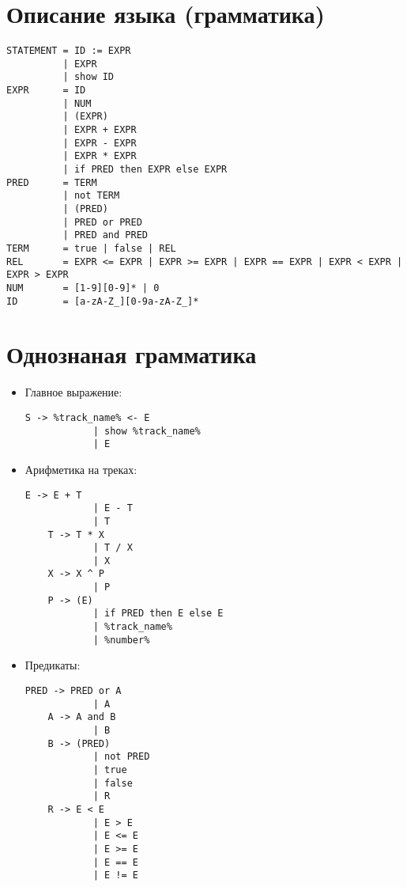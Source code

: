 \newpage
\section*{Описание языка (грамматика)}
\begin{lstlisting}
STATEMENT = ID := EXPR 
          | EXPR
          | show ID
EXPR      = ID
          | NUM
          | (EXPR)
          | EXPR + EXPR
          | EXPR - EXPR
          | EXPR * EXPR
          | if PRED then EXPR else EXPR
PRED      = TERM
          | not TERM
          | (PRED)
          | PRED or PRED
          | PRED and PRED
TERM      = true | false | REL
REL       = EXPR <= EXPR | EXPR >= EXPR | EXPR == EXPR | EXPR < EXPR | EXPR > EXPR
NUM       = [1-9][0-9]* | 0
ID        = [a-zA-Z_][0-9a-zA-Z_]*
\end{lstlisting}

\newpage
\section*{Однознаная грамматика}

\begin{itemize}
\item Главное выражение:
\begin{lstlisting}[style=nonumbers]
	S -> %track_name% <- E
			| show %track_name%
			| E
\end{lstlisting}

\item Арифметика на треках:
\begin{lstlisting}[style=nonumbers]
	E -> E + T
			| E - T
			| T
	T -> T * X
			| T / X
			| X
	X -> X ^ P
			| P
	P -> (E) 
			| if PRED then E else E
			| %track_name% 
			| %number%
\end{lstlisting}

\item Предикаты:
\begin{lstlisting}[style=nonumbers]
	PRED -> PRED or A
			| A
	A -> A and B
			| B
	B -> (PRED)
			| not PRED
			| true
			| false
			| R
	R -> E < E
			| E > E
			| E <= E
			| E >= E
			| E == E
			| E != E
\end{lstlisting}

\end{itemize}

\newpage

